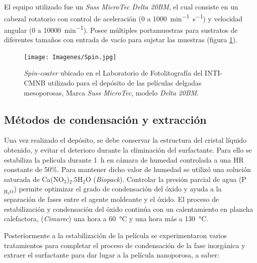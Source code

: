 			 El equipo utilizado fue un \textit{Suss MicroTec Delta 20BM}, el cual consiste en un cabezal rotatorio con control de aceleración (0 a  \SI{1000}{\minute^{-1}.\second^{-1}}) y velocidad angular (0 a \SI{10000}{\minute^{-1}}). Posee múltiples portamuestras para sustratos de diferentes tamaños con entrada de vacío para sujetar las muestras (figura \ref{fig:spin}).   		   


				\begin{figure}[h!]
					  \begin{center}
					  \texttt{[image: Imagenes/Spin.jpg]}
					  \caption[Equipo para el depósito de películas delgadas, \textit{spin-coater}]{\textit{Spin-coater} ubicado en el Laboratorio de Fotolitografía del INTI-CMNB utilizado para el depósito de las películas delgadas mesoporosas, Marca \textit{Suss MicroTec}, modelo \textit{Delta 20BM}.}
					  \label{fig:spin}
					  \end{center}
					  \end{figure}
					
					

	\subsection{Métodos de condensación y extracción}\label{sec:cond_y_extr}

		Una vez realizado el depósito, se debe conservar la estructura del cristal líquido obtenido, y evitar el deterioro durante la eliminación del surfactante. Para ello se estabiliza la película durante \SI{1}{\hour} en cámara de humedad controlada a una HR constante de 50\%. Para mantener dicho valor de humedad se utilizó una solución saturada de Ca(NO$_3$)$_2$.5H$_2$O (\textit{Biopack}). Controlar la presión parcial de agua (P$_{\text{H}_2\text{O}}$) permite optimizar el grado de condensación del óxido y ayuda a la separación de fases entre el agente moldeante y el óxido\cite{Crepaldi2003}. El proceso de estabilización y condensación del óxido continúa con un calentamiento en plancha calefactora, (\textit{Cimarec}) una hora a \SI{60}{\celsius} y una hora más a \SI{130}{\celsius}\cite{Crepaldi2003,Crepaldi2002a}. 
				
		Posteriormente a la estabilización de la película se experimentaron varios tratamientos para completar el proceso de condensación de la fase inorgánica y extraer el surfactante para dar lugar a la película nanoporosa, a saber:

